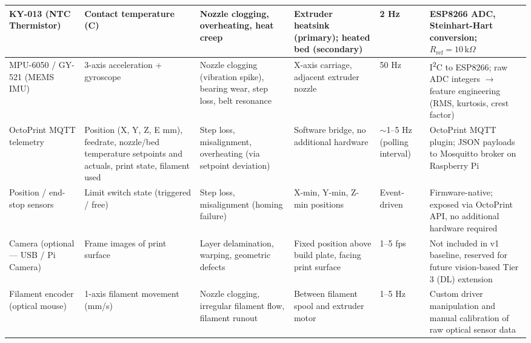\begin{longtable}{|P{2.2cm}|P{2.4cm}|P{2.4cm}|P{2.2cm}|P{1.8cm}|P{2.8cm}|}
	KY-013 (NTC Thermistor) & Contact temperature (\textdegree{}C) & Nozzle clogging, overheating, heat creep & Extruder heatsink (primary); heated bed (secondary) & 2 Hz & ESP8266 ADC, Steinhart-Hart conversion; $R_{\mathrm{ref}} = 10\,\mathrm{k}\Omega$ \\
	\hline
	MPU-6050 / GY-521 (MEMS IMU) & 3-axis acceleration + gyroscope & Nozzle clogging (vibration spike), bearing wear, step loss, belt resonance & X-axis carriage, adjacent extruder nozzle & 50 Hz & I\textsuperscript{2}C to ESP8266; raw ADC integers $\rightarrow$ feature engineering (RMS, kurtosis, crest factor) \\
	\hline
	OctoPrint MQTT telemetry & Position (X, Y, Z, E mm), feedrate, nozzle/bed temperature setpoints and actuals, print state, filament used & Step loss, misalignment, overheating (via setpoint deviation) & Software bridge, no additional hardware & $\sim$1--5 Hz (polling interval) & OctoPrint MQTT plugin; JSON payloads to Mosquitto broker on Raspberry Pi \\
	\hline
	Position / end-stop sensors & Limit switch state (triggered / free) & Step loss, misalignment (homing failure) & X-min, Y-min, Z-min positions & Event-driven & Firmware-native; exposed via OctoPrint API, no additional hardware required \\
	\hline
	Camera (optional --- USB / Pi Camera) & Frame images of print surface & Layer delamination, warping, geometric defects & Fixed position above build plate, facing print surface & 1--5 fps & Not included in v1 baseline, reserved for future vision-based Tier 3 (DL) extension \\
	\hline
	Filament encoder (optical mouse) & 1-axis filament movement (mm/s) & Nozzle clogging, irregular filament flow, filament runout & Between filament spool and extruder motor & 1--5 Hz & Custom driver manipulation and manual calibration of raw optical sensor data \\
	\hline
\end{longtable}